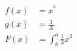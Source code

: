 \documentclass{article}
\begin{document}
	\begin{align*}
		f(x) &=x^^2\\
		g(x) &= \frac{1}{X}\\
		F(x) &= \int^a_b
		\frac{1}{3}x^3
	\end{align*}
\end{document}
